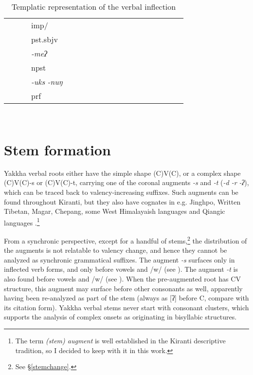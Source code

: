\begin{landscape}
\begin{table}[p]
{\begin{tabular}{lllllllllllllllllll}
	&										&			&	\sc imp/&				&						&						&						&						&					&				&			&				&				&			&				&					&				&				\\
	&										&			&	\sc pst.sbjv&			&						&						&						&						&					&				&			&				&				&			&				&					&				&				\\
	&										&			&	\emph{-meʔ}&			&						&						&						&						&					&				&			&				&				&			&				&					&				&				\\
	&										&			&	\sc npst&				&						&						&						&						&					&				&			&				&				&			&				&					&				&				\\
	&										&			&	\emph{-uks\,\ti\,-nuŋ}&	&						&						&						&						&					&				&			&				&				&			&				&					&				&				\\
	&										&			&	\sc prf&				&						&						&						&						&					&				&			&				&				&			&				&					&				&				\\
	\bottomrule																																																																																		
\end{tabular}\\
}
\caption{Templatic representation of the verbal inflection}\label{xyz}
\end{table} 


\end{landscape}


\pagestyle{scrheadings}

\section{Stem formation}\label{stem}

Yakkha verbal roots either have the simple shape (C)V(C), or a complex shape (C)V(C)-s or (C)V(C)-t, carrying one of the coronal augments  \emph{-s} and \emph{-t} (\emph{\ti -d \ti -r \ti -ʔ}), which can be traced back to valency-increasing suffixes. Such augments can be found throughout Kiranti, but they also have cognates in e.g. Jinghpo, Written Tibetan, Magar, Chepang, some West Himalayaish languages and Qiangic languages \citep[457-59]{Matisoff2003Handbook}.\footnote{The term \emph{(stem) augment} is well established in the Kiranti descriptive tradition, so I decided to keep with it in this work.} 

From a synchronic perspective, except for a handful of stems,\footnote{See §\ref{stemchange}.} the distribution of the augments is not relatable to valency change, and hence they cannot be analyzed as synchronic grammatical suffixes. The augment \emph{-s} surfaces only in inflected verb forms, and only before vowels and /w/ (see \Next[a]). The augment \emph{-t} is also found before vowels and /w/ (see \Next[b]). When the pre-augmented root has CV structure, this augment may surface before other consonants as well, apparently having been re-analyzed as part of the  stem (always as [ʔ] before C, compare \Next[c] with its citation form). Yakkha verbal stems never start with consonant clusters, which supports the analysis of complex onsets as originating in bisyllabic structures. 

